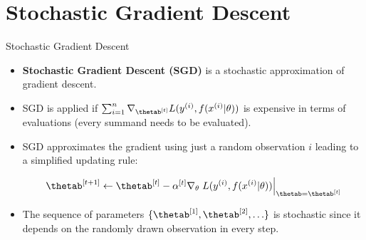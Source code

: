 % 





\section{Stochastic Gradient Descent}


\begin{vbframe}{Stochastic Gradient Descent}
\begin{itemize}
\item \textbf{Stochastic Gradient Descent (SGD)} is a stochastic approximation of gradient descent.
\item SGD is applied if $\sumin \nabla_{\thetab^{[t]}} \Lxyit$ is expensive in terms of evaluations (every summand needs to be evaluated).
\item SGD approximates the gradient using just a random observation $i$ leading to a simplified updating rule:

\begin{eqnarray*}
\thetab^{[t+1]} \leftarrow \thetab^{[t]} - \alpha^{[t]} \nabla_{\theta} \left. \Lxyit \right|_{\thetab = \thetab^{[t]}}
\end{eqnarray*}

\item The sequence of parameters $\{\thetab^{[1]}, \thetab^{[2]}, \hdots \}$ is stochastic since it depends on the randomly drawn observation in every step.
\end{itemize}

\end{vbframe}


